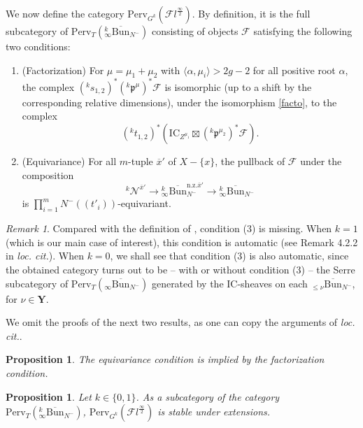 \documentclass[11pt]{amsart}
\theoremstyle{plain}
\newtheorem{prop}[thm]{Proposition}
\theoremstyle{remark}
\newtheorem{rem}[thm]{Remark}
\numberwithin{equation}{section}
\begin{document}
	We now define the category $\mathrm{Perv}_{G^k}(\mathcal{F}l^{\frac{\infty}{2}})$. By definition, it is the full subcategory of $\mathrm{Perv}_T({^k_\infty\overline{\mathrm{Bun}}_{N^-}})$ consisting of objects $\mathcal{F}$ satisfying the following two conditions:
	\begin{enumerate}
		\item (Factorization) For $\mu=\mu_1+\mu_2$ with $\langle\alpha,\mu_i\rangle>2g-2$ for all positive root $\alpha$, the complex $({^ks}_{1,2})^*(^k\mathfrak{p}^\mu)^*\mathcal{F}$ is isomorphic (up to a shift by the corresponding relative dimensions), under the isomorphism \eqref{facto}, to the complex
		$$({^kt}_{1,2})^*(\mathrm{IC}_{Z^{\mu_1}}\boxtimes  (^k\mathfrak{p}^{\mu_2})^*\mathcal{F}).$$
		\item (Equivariance) For all $m$-tuple $\overline{x}'$ of $X-\{x\}$, the pullback of $\mathcal{F}$ under the composition
		$$^k\mathcal{N}^{\overline{x}'}\to {_\infty^k\overline{\mathrm{Bun}}_{N^-}^{\mathrm{n.z.}\overline{x}'}}\to {_\infty^k\overline{\mathrm{Bun}}_{N^-}} $$
		is $\prod_{i=1}^mN^-((t'_i))$-equivariant.
	\end{enumerate}
 \begin{rem}
		Compared with the definition of \cite[§4.2.1]{ABBGM}, condition (3) is missing. When $k=1$ (which is our main case of interest), this condition is automatic (see Remark 4.2.2 in \textit{loc. cit.}). When $k=0$, we shall see that condition (3) is also automatic, since the obtained category turns out to be -- with or without condition (3) -- the Serre subcategory of $\mathrm{Perv}_T({_\infty\overline{\mathrm{Bun}}_{N^-}})$ generated by the IC-sheaves on each $_{\leq\nu}\overline{\mathrm{Bun}}_{N^-}$, for $\nu\in\mathbf{Y}$.  
	\end{rem}
We omit the proofs of the next two results, as one can copy the arguments of \textit{loc. cit.}.
	\begin{prop}{{\cite[Proposition 4.2.8]{ABBGM}}}
		The equivariance condition is implied by the factorization condition.
	\end{prop}
	
	\begin{prop}{{\cite[Corollary 4.2.9]{ABBGM}}}
		Let $k\in\{0,1\}$. As a subcategory of the category $\mathrm{Perv}_T({^k_\infty\overline{\mathrm{Bun}}_{N^-}})$, $\mathrm{Perv}_{G^k}(\mathcal{F}l^{\frac{\infty}{2}})$ is stable under extensions.
	\end{prop}
 
\end{document}
